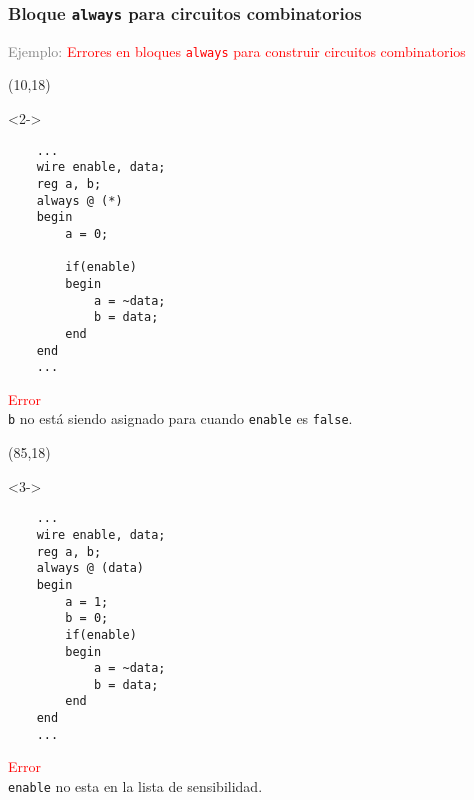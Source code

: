 \documentclass[aspectratio=169]{beamer}
\begin{document}
\begin{frame}[fragile,t]
    \frametitle{Bloque \texttt{always} para circuitos combinatorios}
    \textcolor{gray}{Ejemplo:} \textcolor{red}{Errores en bloques \texttt{always} para construir circuitos combinatorios}
    \begin{textblock}{60}(10,18)
    \begin{onlyenv}<2->
    \lstset{basicstyle=\scriptsize}
\begin{lstlisting}
    ...
    wire enable, data;
    reg a, b;
    always @ (*)
    begin
        a = 0;
        
        if(enable)
        begin
            a = ~data;
            b = data;
        end
    end
    ...
\end{lstlisting}
    \textcolor{red}{Error}\\ \texttt{b} no está siendo asignado para cuando \texttt{enable} es \texttt{false}.
    \end{onlyenv}
    \end{textblock}
    \begin{textblock}{60}(85,18)
    \begin{onlyenv}<3->
    \lstset{basicstyle=\scriptsize}
\begin{lstlisting}
    ...
    wire enable, data;
    reg a, b;
    always @ (data)
    begin
        a = 1;
        b = 0;
        if(enable)
        begin
            a = ~data;
            b = data;
        end
    end
    ...
\end{lstlisting}
    \textcolor{red}{Error}\\ \texttt{enable} no esta en la lista de sensibilidad.
    \end{onlyenv}
    \end{textblock}
\end{frame}
\end{document}
